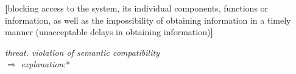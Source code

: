 \documentclass{article}
\begin{document}
\begin{multicols}{2}
\begin{description}[leftmargin=!, labelwidth=1cm, itemsep=-1.5mm]
   \par 
   \begin{description}[leftmargin=!, labelwidth=1cm, itemsep=-1.5mm]
   \item \vspace{-0.5cm} \textbf{[}blocking access to the system, its individual components, functions or information,
as well as the impossibility of obtaining
information in a timely manner (unacceptable delays in obtaining information)\textbf{]}
\end{description}
 \item[$\supset$] \vspace{-0.2cm} \textit {threat. violation of semantic compatibility} \\
   \vspace{0.1cm} \hspace{-0.23cm}  $\Rightarrow$  \hspace{0.5cm} \textit{explanation}:* 
\end{description}
\end{multicols}
\end{document}

